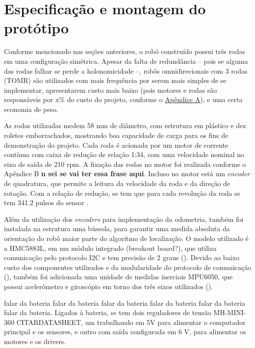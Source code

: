 

\section{Especificação e montagem do protótipo}
\label{sec:montagem}

Conforme mencionado nas seções anteriores, o robô construído possui três rodas em uma configuração simétrica. Apesar da falta de redundância -- pois se alguma das rodas falhar se perde a holonomicidade --, robôs omnidirecionais com 3 rodas (TOMR) são utilizados com mais frequência por serem mais simples de se implementar, apresentarem custo mais baixo (pois motores e rodas são responsáveis por x\% do custo do projeto, conforme o \hyperref[sec:custo]{Apêndice A}), e uma certa economia de peso.

As rodas utilizadas medem 58 mm de diâmetro, com estrutura em plástico e dez roletes emborrachados, mostrando boa capacidade de carga para os fins de demonstração do projeto. Cada roda é acionada por um motor de corrente contínua com caixa de redução de relação 1:34, com uma velocidade nominal no eixo de saída de 210 rpm. A fixação das rodas no motor foi realizada conforme o Apêndice B \textbf{n sei se vai ter essa frase aqui}. Incluso no motor está um \textit{encoder} de quadratura, que permite a leitura da velocidade da roda e da direção de rotação. Com a relação de redução, se tem que para cada revolução da roda se tem 341.2 pulsos do sensor \cite{motor}.



Além da utilização dos \textit{encoders} para implementação da odometria, também foi instalada na estrutura uma bússola, para garantir uma medida absoluta da orientação do robô maior parte do algoritmo de localização. O modelo utilizado é a HMC5883L, em um módulo integrado (breakout board?), que utiliza comunicação pelo protocolo I2C e tem precisão de 2 graus (\cite{HMC5883L}). Devido ao baixo custo dos componentes utilizados e da modularidade do protocolo de comunicação (\cite{semiconductors2000i2c}), também foi adicionada uma unidade de medidas inerciais MPU6050, que possui acelerômetro e giroscópio em torno dos três eixos utilizados (\cite{MPU6050}).

falar da bateria falar da bateria falar da bateria falar da bateria falar da bateria falar da bateria. Ligados à bateria, se tem dois reguladores de tensão MH-MINI-360 CITARDATASHEET, um trabalhando em 5V para alimentar o computador principal e os sensores, e outro com saída configurada em 6 V, para alimentar os motores e os drivers.

